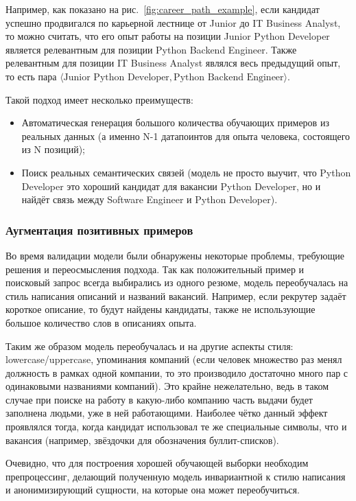 \documentclass[14pt]{mmcs_article}
\begin{document}
Например, как показано на рис.~\ref{fig:career_path_example}, если кандидат успешно продвигался по карьерной лестнице от Junior до IT Business Analyst, то можно считать, что его опыт работы на позиции Junior Python Developer является релевантным для позиции Python Backend Engineer. Также релевантным для позиции IT Business Analyst являлся весь предыдущий опыт, то есть пара $\langle\text{Junior Python Developer},\text{Python Backend Engineer}\rangle$.

Такой подход имеет несколько преимуществ:
\begin{itemize}
  \item Автоматическая генерация большого количества обучающих примеров из реальных данных (а именно N-1 датапоинтов для опыта человека, состоящего из N позиций);
  \item Поиск реальных семантических связей (модель не просто выучит, что Python Developer это хороший кандидат для вакансии Python Developer, но и найдёт связь между Software Engineer и Python Developer).
\end{itemize}

\subsubsection{Аугментация позитивных примеров}

Во время валидации модели были обнаружены некоторые проблемы, требующие решения и переосмысления подхода.
Так как положительный пример и поисковый запрос всегда выбирались из одного резюме, модель переобучалась на стиль написания описаний и названий вакансий. Например, если рекрутер задаёт короткое описание, то будут найдены кандидаты, также не использующие большое количество слов в описаниях опыта.

Таким же образом модель переобучалась и на другие аспекты стиля: lowercase/uppercase, упоминания компаний (если человек множество раз менял должность в рамках одной компании, то это производило достаточно много пар с одинаковыми названиями компаний). Это крайне нежелательно, ведь в таком случае при поиске на работу в какую-либо компанию часть выдачи будет заполнена людьми, уже в ней работающими. Наиболее чётко данный эффект проявлялся тогда, когда кандидат использовал те же специальные символы, что и вакансия (например, звёздочки для обозначения буллит-списков).

Очевидно, что для построения хорошей обучающей выборки необходим препроцессинг, делающий полученную модель инвариантной к стилю написания и анонимизирующий сущности, на которые она может переобучиться.
\end{document}
